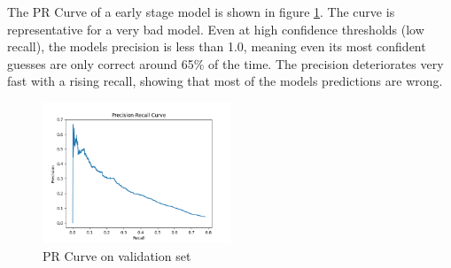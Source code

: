 \documentclass[
    headings=optiontohead,              %
    12pt,                               %
    DIV=13,                             %
    twoside=false,                      %
    open=right,                         %
    BCOR=00mm,                          %
    toc=bibliographynumbered,            %
    parskip=half,                       %
]{scrarticle}
\begin{document}

    The PR Curve of a early stage model is shown in figure \ref{fig:6.3}. The curve is representative for a very bad model. Even at high confidence thresholds (low recall), the models precision is less than 1.0, meaning even its most confident guesses are only correct around 65\% of the time. 
    The precision deteriorates very fast with a rising recall, showing that most of the models predictions are wrong.

    \begin{figure}[htpb]
        \centering
        \includegraphics[width=0.5\textwidth]{../pr_curve.png}
        \caption{PR Curve on validation set}
        \label{fig:6.3}
    \end{figure}

    
\end{document}
